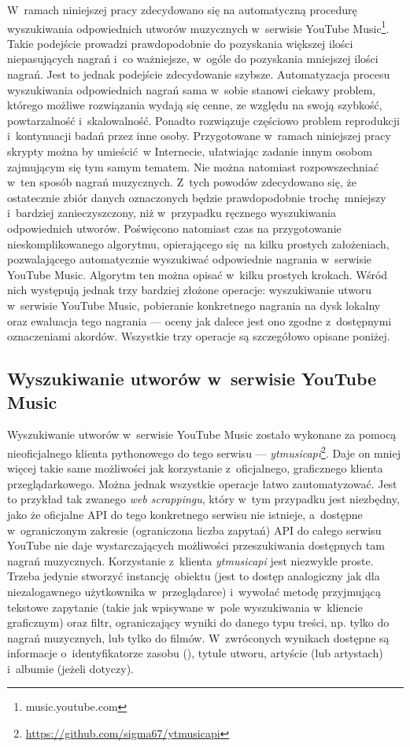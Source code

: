 W~ramach niniejszej pracy zdecydowano się na automatyczną procedurę wyszukiwania odpowiednich utworów muzycznych w~serwisie YouTube Music\footnote{music.youtube.com}. Takie podejście prowadzi prawdopodobnie do pozyskania większej ilości niepasujących nagrań i~co ważniejsze, w~ogóle do pozyskania mniejszej ilości nagrań. Jest to jednak podejście zdecydowanie szybsze. Automatyzacja procesu wyszukiwania odpowiednich nagrań sama w~sobie stanowi ciekawy problem, którego możliwe rozwiązania wydają się cenne, ze względu na swoją szybkość, powtarzalność i~skalowalność.  Ponadto rozwiązuje częściowo problem reprodukcji i~kontynuacji badań przez inne osoby.  Przygotowane w~ramach niniejszej pracy skrypty można by umieścić w Internecie, ułatwiając zadanie innym osobom zajmującym się tym samym tematem. Nie można natomiast rozpowszechniać w~ten sposób nagrań muzycznych. Z~tych powodów zdecydowano się, że ostatecznie zbiór danych oznaczonych będzie prawdopodobnie trochę mniejszy i~bardziej zanieczyszczony, niż w~przypadku ręcznego wyszukiwania odpowiednich utworów. Poświęcono natomiast czas na przygotowanie nieskomplikowanego algorytmu, opierającego się na kilku prostych założeniach, pozwalającego automatycznie wyszukiwać odpowiednie nagrania w~serwisie YouTube Music. Algorytm ten można opisać w~kilku prostych krokach. Wśród nich występują jednak trzy bardziej złożone operacje: wyszukiwanie utworu w~serwisie YouTube Music, pobieranie konkretnego nagrania na dysk lokalny oraz ewaluacja tego nagrania --- oceny jak dalece jest ono zgodne z~dostępnymi oznaczeniami akordów. Wszystkie trzy operacje są szczegółowo opisane poniżej.

\subsection{Wyszukiwanie utworów w~serwisie YouTube Music}

Wyszukiwanie utworów w~serwisie YouTube Music zostało wykonane za pomocą nieoficjalnego klienta pythonowego do tego serwisu --- \emph{ytmusicapi}\footnote{\url{https://github.com/sigma67/ytmusicapi}}.  Daje on mniej więcej takie same możliwości jak korzystanie z~oficjalnego, graficznego klienta przeglądarkowego. Można jednak wszystkie operacje łatwo zautomatyzować. Jest to przykład tak zwanego \emph{web scrappingu}, który w~tym przypadku jest niezbędny, jako że oficjalne API do tego konkretnego serwisu nie istnieje, a~dostępne w~ograniczonym zakresie (ograniczona liczba zapytań) API do całego serwisu YouTube nie daje wystarczających możliwości przeszukiwania dostępnych tam nagrań muzycznych.  Korzystanie z~klienta \emph{ytmusicapi} jest niezwykle proste. Trzeba jedynie stworzyć instancję obiektu  (jest to dostęp analogiczny jak dla niezalogawnego użytkownika w~przeglądarce) i~wywołać metodę  przyjmującą tekstowe zapytanie (takie jak wpisywane w~pole wyszukiwania w~kliencie graficznym) oraz filtr, ograniczający wyniki do danego typu treści, np.  tylko do nagrań muzycznych, lub tylko do filmów. W~zwróconych wynikach dostępne są informacje o~identyfikatorze zasobu (), tytule utworu, artyście (lub artystach) i~albumie (jeżeli dotyczy).

